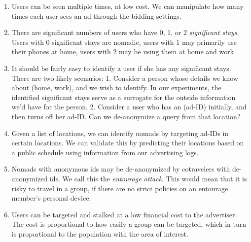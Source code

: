 \begin{enumerate}
\item Users can be seen multiple times, at low cost. We can manipulate how many times each user sees an ad through the bidding settings.

\item There are significant numbers of users who have 0, 1, or 2 \emph{significant stays}. Users with 0 significant stays are nomadic, users with 1 may primarily use their phones at home, users with 2 may be using them at home and work.

\item It should be fairly easy to identify a user if she has any significant stays. There are two likely scenarios: 1. Consider a person whose details we know about (home, work), and we wish to identify. In our experiments, the identified significant stays serve as a surrogate for the outside information we'd have for the person. 2. Consider a user who has an (ad-ID) initially, and then turns off her ad-ID. Can we de-anonymize a query from that location?

\item Given a list of locations, we can identify nomads by targeting ad-IDs in certain locations. We can validate this by predicting their locations based on a public schedule using information from our advertising logs. 

\item Nomads with anonymous ids may be de-anonymized by cotravelers with de-anonymized ids. We call this the \emph{entourage attack}. This would mean that it is risky to travel in a group, if there are no strict policies on an entourage member's personal device.

\item Users can be targeted and stalked at a low financial cost to the advertiser. The cost is proportional to how easily a group can be targeted, which in turn is proportional to the population with the area of interest.
\end{enumerate}



